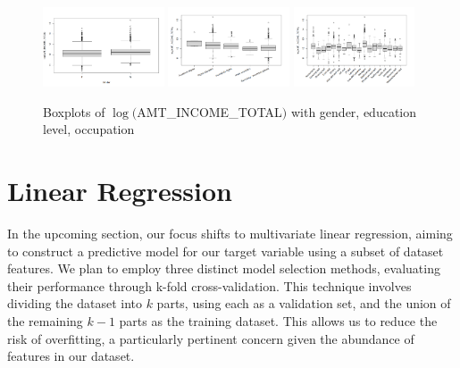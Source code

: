 \documentclass[hidelinks,12pt]{article}
\begin{document}
\begin{figure}[h]
  \begin{center}  
  \includegraphics[width=0.32\textwidth]{img/392bcde4-d644-4740-8e7a-72728996638d.png}
  \includegraphics[width=0.32\textwidth]{img/3601fa4a-3df4-4656-831c-429f690699f2.png}
  \includegraphics[width=0.32\textwidth]{img/8d368ccf-52dc-4c06-abaa-e6d8c64b5b73.png}
  \end{center}
\caption{Boxplots of $\log($AMT\_INCOME\_TOTAL$)$ with gender, education level, occupation}
\end{figure}
\section{Linear Regression}
In the upcoming section, our focus shifts to multivariate linear regression, aiming to construct a predictive model for our target variable using a subset of dataset features. We plan to employ three distinct model selection methods, evaluating their performance through k-fold cross-validation. This technique involves dividing the dataset into $k$ parts, using each as a validation set, and the union of the remaining $k-1$ parts as the training dataset. This allows us to reduce the risk of overfitting, a particularly pertinent concern given the abundance of features in our dataset. 
\end{document}

